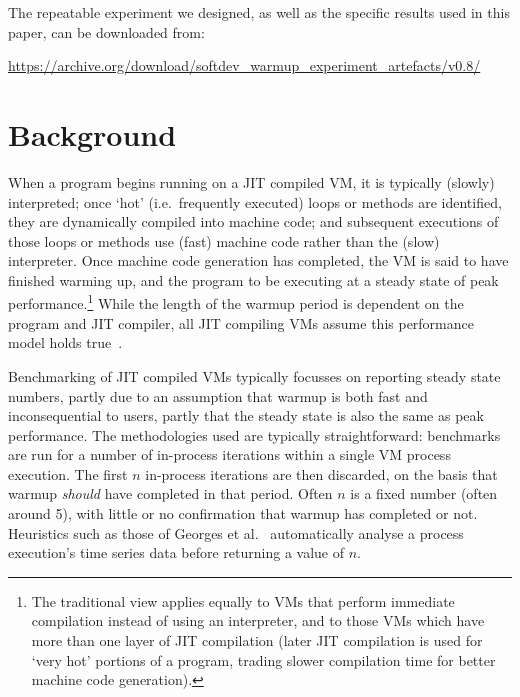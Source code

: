\documentclass[acmlarge]{acmart}\settopmatter{printfolios=true}
\begin{document}
The repeatable experiment we designed, as well as the specific results used
in this paper, can be downloaded from:
\vspace{-.5em}
\begin{center}
\url{https://archive.org/download/softdev_warmup_experiment_artefacts/v0.8/}
\end{center}


\section{Background}
\label{sec:warmup}

When a program begins running on a JIT compiled VM, it is typically (slowly)
interpreted; once `hot' (i.e.~frequently executed) loops or methods are
identified, they are dynamically compiled into machine code; and subsequent
executions of those loops or methods use (fast) machine code rather than the
(slow) interpreter. Once machine code generation has completed, the VM is
said to have finished warming up, and the program to be executing
at a steady state of peak performance.\footnote{The traditional view applies equally to VMs
that perform immediate compilation instead of using an interpreter, and to
those VMs which have more than one layer of JIT compilation (later JIT
compilation is used for `very hot' portions of a program, trading slower
compilation time for better machine code generation).}
While the length of the warmup period
is dependent on the program and JIT compiler, all JIT compiling
VMs assume this performance model holds true~\cite{kalibera13rigorous}.

Benchmarking of JIT compiled VMs typically focusses on reporting
steady state numbers, partly due to an assumption that
warmup is both fast and inconsequential to users, partly that
the steady state is also the same as peak performance.
The methodologies used are typically straightforward: benchmarks are run for a number
of in-process iterations within a single VM process execution.
The first $n$ in-process iterations
are then discarded, on the basis that warmup \emph{should} have completed in
that period. Often $n$ is a fixed number (often around 5), with little or no confirmation
that warmup has completed or not. Heuristics such as
those of Georges et al.~\cite{georges07statistically} automatically analyse
a process execution's time series data before returning a value of $n$.
\end{document}
